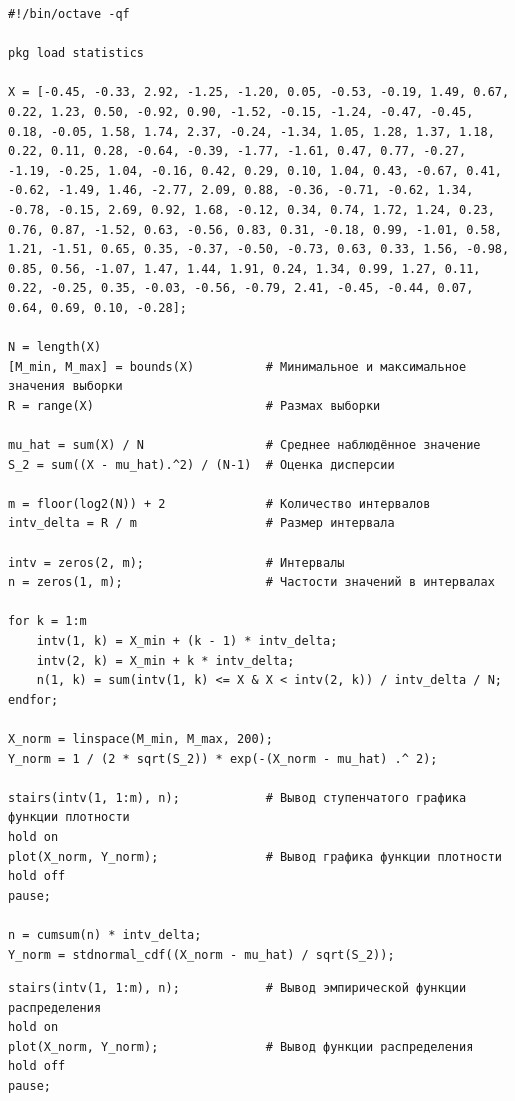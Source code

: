 \begin{lstlisting}
#!/bin/octave -qf

pkg load statistics

X = [-0.45, -0.33, 2.92, -1.25, -1.20, 0.05, -0.53, -0.19, 1.49, 0.67, 0.22, 1.23, 0.50, -0.92, 0.90, -1.52, -0.15, -1.24, -0.47, -0.45, 0.18, -0.05, 1.58, 1.74, 2.37, -0.24, -1.34, 1.05, 1.28, 1.37, 1.18, 0.22, 0.11, 0.28, -0.64, -0.39, -1.77, -1.61, 0.47, 0.77, -0.27, -1.19, -0.25, 1.04, -0.16, 0.42, 0.29, 0.10, 1.04, 0.43, -0.67, 0.41, -0.62, -1.49, 1.46, -2.77, 2.09, 0.88, -0.36, -0.71, -0.62, 1.34, -0.78, -0.15, 2.69, 0.92, 1.68, -0.12, 0.34, 0.74, 1.72, 1.24, 0.23, 0.76, 0.87, -1.52, 0.63, -0.56, 0.83, 0.31, -0.18, 0.99, -1.01, 0.58, 1.21, -1.51, 0.65, 0.35, -0.37, -0.50, -0.73, 0.63, 0.33, 1.56, -0.98, 0.85, 0.56, -1.07, 1.47, 1.44, 1.91, 0.24, 1.34, 0.99, 1.27, 0.11, 0.22, -0.25, 0.35, -0.03, -0.56, -0.79, 2.41, -0.45, -0.44, 0.07, 0.64, 0.69, 0.10, -0.28];

N = length(X)
[M_min, M_max] = bounds(X)          # Минимальное и максимальное значения выборки
R = range(X)                        # Размах выборки

mu_hat = sum(X) / N                 # Среднее наблюдённое значение
S_2 = sum((X - mu_hat).^2) / (N-1)  # Оценка дисперсии

m = floor(log2(N)) + 2              # Количество интервалов
intv_delta = R / m                  # Размер интервала

intv = zeros(2, m);                 # Интервалы
n = zeros(1, m);                    # Частости значений в интервалах 

for k = 1:m
	intv(1, k) = X_min + (k - 1) * intv_delta;
	intv(2, k) = X_min + k * intv_delta;
	n(1, k) = sum(intv(1, k) <= X & X < intv(2, k)) / intv_delta / N;
endfor;

X_norm = linspace(M_min, M_max, 200);
Y_norm = 1 / (2 * sqrt(S_2)) * exp(-(X_norm - mu_hat) .^ 2);

stairs(intv(1, 1:m), n);            # Вывод ступенчатого графика функции плотности
hold on
plot(X_norm, Y_norm);               # Вывод графика функции плотности
hold off
pause;

n = cumsum(n) * intv_delta;
Y_norm = stdnormal_cdf((X_norm - mu_hat) / sqrt(S_2));
\end{lstlisting}

\clearpage

\begin{lstlisting}[firstnumber=37]
stairs(intv(1, 1:m), n);            # Вывод эмпирической функции распределения
hold on
plot(X_norm, Y_norm);               # Вывод функции распределения
hold off
pause;
\end{lstlisting}


